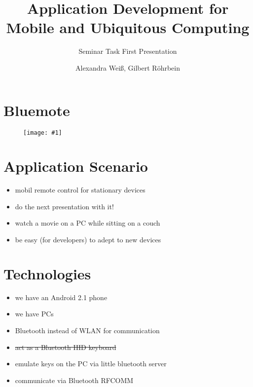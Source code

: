 \documentclass[ddc nogerman]{tudbeamer}
\newcommand{\imageframe}[1]{
    \begin{frame}
        \begin{figure}
            \centering
            \texttt{[image: \#1]}
        \end{figure}
    \end{frame}
}
\begin{document}

\title{Application Development for Mobile and Ubiquitous Computing}
\subtitle{Seminar Task First Presentation}
\author{Alexandra Weiß, Gilbert Röhrbein}

\maketitle

\section{Bluemote}
\begin{frame}
\end{frame}

\imageframe{img/remotecat.jpg}

\section{Application Scenario}
\begin{frame}
    \begin{itemize}
        \item mobil remote control for stationary devices
        \item do the next presentation with it!
        \item watch a movie on a PC while sitting on a couch
        \item be easy (for developers) to adept to new devices
    \end{itemize}
\end{frame}

\section{Technologies}
\begin{frame}
    \begin{itemize}
        \item we have an Android 2.1 phone
        \item we have PCs
        \item Bluetooth instead of WLAN for communication
        \item\sout{act as a Bluetooth HID keyboard}
        \item emulate keys on the PC via little bluetooth server
        \item communicate via Bluetooth RFCOMM
    \end{itemize}
\end{frame}
\end{document}
